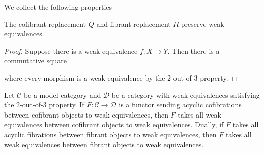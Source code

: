 \documentclass[../thesis.tex]{subfiles}
\begin{document}
            We collect the following properties

            \begin{lemma}\label{lem: Q-preserves-weak}
                The cofibrant replacement $Q$ and fibrant replacement $R$ preserve weak equivalences. 
            \end{lemma}

            \begin{proof}
                Suppose there is a weak equivalence $f: X \rightarrow Y$. Then there is a commutative square
                \begin{center}
                \end{center}
                where every morphism is a weak equivalence by the $2$-out-of-$3$ property.
            \end{proof}

            \begin{lemma}\label{lem: Ken-Brown}
                Let $\mathcal{C}$ be a model category and $\mathcal{D}$ be a category with weak equivalences satisfying the $2$-out-of-$3$ property. If $F:\mathcal{C} \rightarrow \mathcal{D}$ is a functor sending acyclic cofibrations between cofibrant objects to weak equivalences, then $F$ takes all weak equivalences between cofibrant objects to weak equivalences. Dually, if $F$ takes all acyclic fibrations between fibrant objects to weak equivalences, then $F$ takes all weak equivalences between fibrant objects to weak equivalences.
            \end{lemma}
\end{document}
